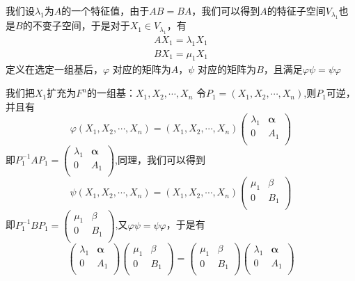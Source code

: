 \documentclass[lang=cn,10pt]{elegantbook}
\begin{document}
我们设$\lambda_{1}$为$A$的一个特征值，由于$AB=BA$，我们可以得到$A$的特征子空间$V_{\lambda_{1}}$也是$B$的不变子空间，于是对于$X_{1}\in V_{\lambda_{1}}$，有
\begin{equation*}
	\begin{split}
		AX_1=\lambda _1X_1
		\\
		BX_1=\mu _1X_1
	\end{split}
\end{equation*}
定义在选定一组基后，$\varphi$ 对应的矩阵为$A$，$\psi$ 对应的矩阵为$B$，且满足$\varphi \psi =\psi \varphi$

我们把$X_1$扩充为$F^{n}$的一组基：$X_{1},X_{2},\cdots,X_{n}$
令$P_{1}=(X_{1},X_{2},\cdots,X_{n})$,则$P_{1}$可逆，并且有
\begin{equation*}
	 \varphi \left( X_1,X_2,\cdots ,X_n \right) =\left( X_1,X_2,\cdots ,X_n \right) \left( \begin{matrix}
	 	\lambda _1&		\boldsymbol{\alpha }\\
	 	0&		A_1\\
	 \end{matrix} \right) 
\end{equation*}
即$P_{1}^{-1}AP_{1}^{}=\left( \begin{matrix}
	\lambda _1&		\boldsymbol{\alpha }\\
	0&		A_1\\
\end{matrix} \right) $,同理，我们可以得到
\begin{equation*}
	\psi \left( X_1,X_2,\cdots ,X_n \right) =\left( X_1,X_2,\cdots ,X_n \right) \left( \begin{matrix}
		\mu _1&		\beta\\
		0&		B_1\\
	\end{matrix} \right) 
\end{equation*}
即$P_{1}^{-1}BP_{1}^{}=\left( \begin{matrix}
	\mu _1&		\beta\\
	0&		B_1\\
\end{matrix} \right) $,又$\varphi \psi =\psi \varphi$，于是有
\begin{equation*}
	\left( \begin{matrix}
		\lambda _1&		\boldsymbol{\alpha }\\
		0&		A_1\\
	\end{matrix} \right) \left( \begin{matrix}
		\mu _1&		\beta\\
		0&		B_1\\
	\end{matrix} \right) =\left( \begin{matrix}
		\mu _1&		\beta\\
		0&		B_1\\
	\end{matrix} \right) \left( \begin{matrix}
		\lambda _1&		\boldsymbol{\alpha }\\
		0&		A_1\\
	\end{matrix} \right)
\end{equation*}
\end{document}
